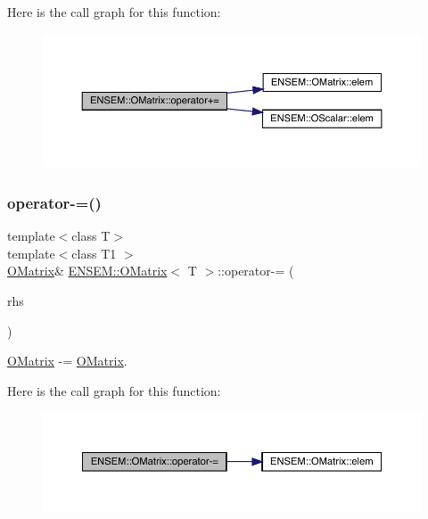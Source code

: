 Here is the call graph for this function\+:
\nopagebreak
\begin{figure}[H]
\begin{center}
\leavevmode
\includegraphics[width=350pt]{dd/d80/classENSEM_1_1OMatrix_ab488697fd72f3891fede3d00f8deb019_cgraph}
\end{center}
\end{figure}
\mbox{\label{classENSEM_1_1OMatrix_a4c9bcdd861f4439d1b165ec5285cf55f}} 
\subsubsection{\texorpdfstring{operator-\/=()}{operator-=()}\hspace{0.1cm}{\footnotesize\ttfamily [1/6]}}
{\footnotesize\ttfamily template$<$class T$>$ \\
template$<$class T1 $>$ \\
\mbox{\hyperlink{classENSEM_1_1OMatrix}{O\+Matrix}}\& \mbox{\hyperlink{classENSEM_1_1OMatrix}{E\+N\+S\+E\+M\+::\+O\+Matrix}}$<$ T $>$\+::operator-\/= (\begin{DoxyParamCaption}\item[{const \mbox{\hyperlink{classENSEM_1_1OMatrix}{O\+Matrix}}$<$ T1 $>$ \&}]{rhs }\end{DoxyParamCaption})\hspace{0.3cm}{\ttfamily [inline]}}



\mbox{\hyperlink{classENSEM_1_1OMatrix}{O\+Matrix}} -\/= \mbox{\hyperlink{classENSEM_1_1OMatrix}{O\+Matrix}}. 

Here is the call graph for this function\+:
\nopagebreak
\begin{figure}[H]
\begin{center}
\leavevmode
\includegraphics[width=350pt]{dd/d80/classENSEM_1_1OMatrix_a4c9bcdd861f4439d1b165ec5285cf55f_cgraph}
\end{center}
\end{figure}
\mbox{\label{classENSEM_1_1OMatrix_a4c9bcdd861f4439d1b165ec5285cf55f}} 
